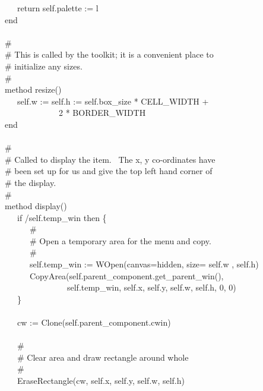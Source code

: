 {\>   \ \ \ return self.palette := l \\
\>   end \\
\ \\
\>   \# \\
\>   \# This is called by the toolkit; it is a convenient place to \\
\>   \# initialize any sizes. \\
\>   \# \\
\>   method resize() \\
\>   \ \ \ self.w := self.h := self.box\_size * CELL\_WIDTH +  \\
\>   \ \ \ \ \ \ \ \ \ \ \ \ \ 2 * BORDER\_WIDTH \\
\>   end \\
\ \\
\>   \# \\
\>   \# Called to display the item. \ The x, y co-ordinates have \\
\>   \# been set up for us and give the top left hand corner of  \\
\>   \# the display.  \\
\>   \# \\
\>   method display() \\
\>   \ \ \ if /self.temp\_win then \{ \\
\>   \ \ \ \ \ \ \# \\
\>   \ \ \ \ \ \ \# Open a temporary area for the menu and copy. \\
\>   \ \ \ \ \ \ \# \\
\>   \ \ \ \ \ \ self.temp\_win :=
WOpen({\textquotedbl}canvas=hidden{\textquotedbl},
{\textquotedbl}size={\textquotedbl} {\textbar}{\textbar} self.w
{\textbar}{\textbar} {\textquotedbl},{\textquotedbl}
{\textbar}{\textbar} self.h) \\
\>   \ \ \ \ \ \ CopyArea(self.parent\_component.get\_parent\_win(), \\
\>   \ \ \ \ \ \ \ \ \ \ \ \ \ \ \ self.temp\_win, self.x, self.y,
self.w, self.h, 0, 0) \\
\>   \ \ \ \} \\
\ \\
\>   \ \ \ cw := Clone(self.parent\_component.cwin) \\
\ \\
\>   \ \ \ \# \\
\>   \ \ \ \# Clear area and draw rectangle around whole \\
\>   \ \ \ \# \\
\>   \ \ \ EraseRectangle(cw, self.x, self.y, self.w, self.h) \\
}
